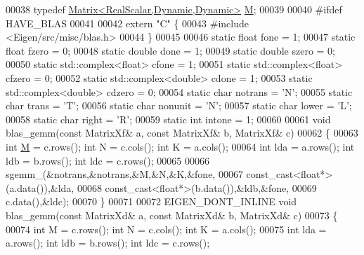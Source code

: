 \begin{DoxyCode}
00038 \textcolor{keyword}{typedef} \hyperlink{group___core___module_class_eigen_1_1_matrix}{Matrix<RealScalar,Dynamic,Dynamic>} \hyperlink{group___core___module_class_eigen_1_1_matrix}{M};
00039 
00040 \textcolor{preprocessor}{#ifdef HAVE\_BLAS}
00041 
00042 \textcolor{keyword}{extern} \textcolor{stringliteral}{"C"} \{
00043 \textcolor{preprocessor}{  #include <Eigen/src/misc/blas.h>}
00044 \}
00045 
00046 \textcolor{keyword}{static} \textcolor{keywordtype}{float} fone = 1;
00047 \textcolor{keyword}{static} \textcolor{keywordtype}{float} fzero = 0;
00048 \textcolor{keyword}{static} \textcolor{keywordtype}{double} done = 1;
00049 \textcolor{keyword}{static} \textcolor{keywordtype}{double} szero = 0;
00050 \textcolor{keyword}{static} std::complex<float> cfone = 1;
00051 \textcolor{keyword}{static} std::complex<float> cfzero = 0;
00052 \textcolor{keyword}{static} std::complex<double> cdone = 1;
00053 \textcolor{keyword}{static} std::complex<double> cdzero = 0;
00054 \textcolor{keyword}{static} \textcolor{keywordtype}{char} notrans = \textcolor{charliteral}{'N'};
00055 \textcolor{keyword}{static} \textcolor{keywordtype}{char} trans = \textcolor{charliteral}{'T'};  
00056 \textcolor{keyword}{static} \textcolor{keywordtype}{char} nonunit = \textcolor{charliteral}{'N'};
00057 \textcolor{keyword}{static} \textcolor{keywordtype}{char} lower = \textcolor{charliteral}{'L'};
00058 \textcolor{keyword}{static} \textcolor{keywordtype}{char} right = \textcolor{charliteral}{'R'};
00059 \textcolor{keyword}{static} \textcolor{keywordtype}{int} intone = 1;
00060 
00061 \textcolor{keywordtype}{void} blas\_gemm(\textcolor{keyword}{const} MatrixXf& a, \textcolor{keyword}{const} MatrixXf& b, MatrixXf& c)
00062 \{
00063   \textcolor{keywordtype}{int} \hyperlink{group___core___module_class_eigen_1_1_matrix}{M} = c.rows(); \textcolor{keywordtype}{int} N = c.cols(); \textcolor{keywordtype}{int} K = a.cols();
00064   \textcolor{keywordtype}{int} lda = a.rows(); \textcolor{keywordtype}{int} ldb = b.rows(); \textcolor{keywordtype}{int} ldc = c.rows();
00065 
00066   sgemm\_(&notrans,&notrans,&M,&N,&K,&fone,
00067          const\_cast<float*>(a.data()),&lda,
00068          const\_cast<float*>(b.data()),&ldb,&fone,
00069          c.data(),&ldc);
00070 \}
00071 
00072 EIGEN\_DONT\_INLINE \textcolor{keywordtype}{void} blas\_gemm(\textcolor{keyword}{const} MatrixXd& a, \textcolor{keyword}{const} MatrixXd& b, MatrixXd& c)
00073 \{
00074   \textcolor{keywordtype}{int} M = c.rows(); \textcolor{keywordtype}{int} N = c.cols(); \textcolor{keywordtype}{int} K = a.cols();
00075   \textcolor{keywordtype}{int} lda = a.rows(); \textcolor{keywordtype}{int} ldb = b.rows(); \textcolor{keywordtype}{int} ldc = c.rows();

\end{DoxyCode}
